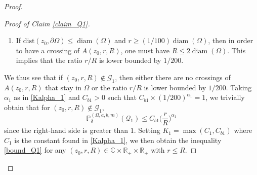 \documentclass{article}
\newcommand{\PP}{{\mathbb{P}}}
\theoremstyle{definition}
\theoremstyle{remark}
\theoremstyle{remark}
\begin{document}
\begin{proof}
\begin{proof}[Proof of Claim \ref{claim_Q1}]
\begin{enumerate}
    \item If $\text{dist}(z_0, \partial \Omega) \leq \operatorname{diam}(\Omega)$ and $r \geq (1/100)\operatorname{diam}(\Omega)$, then in order to have a crossing of $A(z_0,r,R)$, one must have $R \leq 2\operatorname{diam}(\Omega)$. This implies that the ratio $r/R$ is lower bounded by $1/200$.
\end{enumerate}
We thus see that if $(z_0,r,R) \notin \mathcal{G}_1$, then either there are no crossings of $A(z_0,r,R)$ that stay in $\Omega$ or the ratio $r/R$ is lower bounded by $1/200$. Taking $\alpha_1$ as in \eqref{Kalpha_1} and $C_{b1}>0$ such that $C_{b1}\times(1/200)^{\alpha_1}=1$, we trivially obtain that for $(z_0,r,R) \notin \mathcal{G}_1$,
\begin{equation*}
    \PP_{\delta}^{(\Omega,a,b,m)}(\mathcal{Q}_1) \leq C_{b1} \bigg( \frac{r}{R}\bigg)^{\alpha_1}
\end{equation*}
since the right-hand side is greater than $1$. Setting $K_1 = \max(C_1, C_{b1})$ where $C_1$ is the constant found in \eqref{Kalpha_1}, we then obtain the inequality \eqref{bound_Q1} for any $(z_0,r,R) \in \mathbb{C} \times \mathbb{R}_{+} \times \mathbb{R}_{+}$ with $r \leq R$.


\end{proof}
\end{proof}
\end{document}
